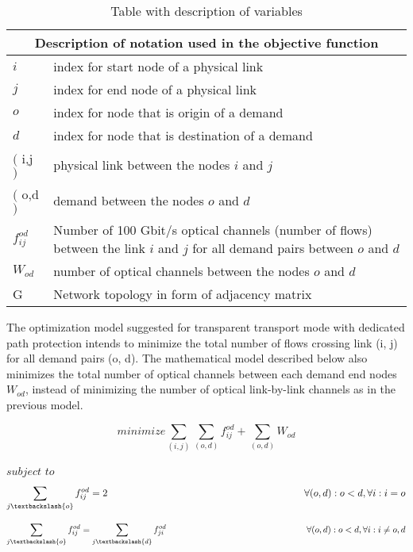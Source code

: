 \begin{table}[h!]
\centering
\begin{tabular}{ |p{1cm}||p{13cm}|}
 \hline
 \multicolumn{2}{|c|}{Description of notation used in the objective function} \\
 \hline
 \hline
 $i$ & index for start node of a physical link \\
 $j$ & index for end node of a physical link \\
 $o$ & index for node that is origin of a demand \\
 $d$ & index for node that is destination of a demand \\
 $($ i,j $)$ & physical link between the nodes $i$ and $j$ \\
 $($ o,d $)$ & demand between the nodes $o$ and $d$ \\
 $f_{ij}^{od}$ & Number of 100 Gbit/s optical channels (number of flows) between the link $i$ and $j$ for all demand pairs between $o$ and $d$ \\
 $W_{od}$ & number of optical channels between the nodes $o$ and $d$\\
 G & Network topology in form of adjacency matrix \\
 \hline
\end{tabular}
\caption{Table with description of variables}
\label{description_transp}
\end{table}


The optimization model suggested for transparent transport mode with dedicated path protection intends to minimize the total number of flows crossing link (i, j) for all demand pairs (o, d). The mathematical model described below also minimizes the total number of optical channels between each demand end nodes $W_{od}$, instead of minimizing the number of optical link-by-link channels as in the previous model.

\vspace{10pt}
\begin{equation}
minimize    \sum_{(i,j)} \sum_{(o,d)} f_{ij}^{od} + \sum_{(o,d)} W_{od}
\label{ILPTransp}
\end{equation}

$subject$ $to$
\begin{equation}
\sum_{j\textbackslash \{o\}} f_{ij}^{od} = 2  \qquad \qquad \qquad \qquad \qquad \qquad \qquad \qquad \qquad \qquad
\forall(o,d) : o < d, \forall i: i = o
\label{ILPTransp1}
\end{equation}

\begin{equation}
\sum_{j\textbackslash \{o\}} f_{ij}^{od} = \sum_{j\textbackslash \{d\}} f_{ji}^{od}   \qquad \qquad \qquad \qquad \qquad \qquad \qquad \qquad
\forall(o,d) : o < d, \forall i: i \neq o,d
\label{ILPTransp2}
\end{equation}

